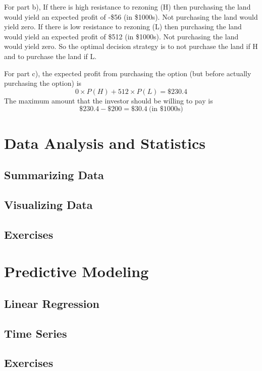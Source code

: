 \documentclass[12pt]{book}
\begin{document}
\begin{enumerate}
\begin{solution}
For part b), If there is high resistance to rezoning (H) then
purchasing the land would yield an expected profit of -\$56 (in \$1000s).
Not purchasing the land would yield zero. If there is low
resistance to rezoning (L) then purchasing the land would yield
an expected profit of \$512 (in \$1000s). Not purchasing the
land would yield zero. So the optimal decision strategy is to
not purchase the land if H and to purchase the land if L.

For part c), the expected profit from purchasing the option
(but before actually purchasing the option) is
\[ 0 \times P(H) + 512 \times P(L) = \$230.4 \]
The maximum amount that the investor should be willing to pay is
\[ \$230.4 - \$200 = \$30.4 ~\text{(in \$1000s)} \]
\end{solution}


\end{enumerate}

%
\chapter{Data Analysis and Statistics}

\section{Summarizing Data}

\section{Visualizing Data}

\section{Exercises}

%
\chapter{Predictive Modeling}

\section{Linear Regression}

\section{Time Series}

\section{Exercises}
\end{document}
